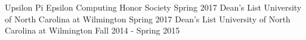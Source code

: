 

\begin{cvhonors}

  \cvhonor
    {Upsilon Pi Epsilon}
    {Computing Honor Society}
    {}
    {Spring 2017}
  \cvhonor
    {Dean's List}
    {University of North Carolina at Wilmington}
    {}
    {Spring 2017}
  \cvhonor
    {Dean's List}
    {University of North Carolina at Wilmington}
    {}
    {Fall 2014 - Spring 2015}

\end{cvhonors}

